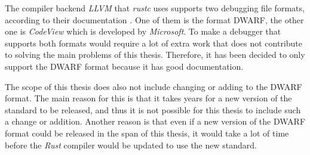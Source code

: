 %



The compiler backend \emph{LLVM} that \emph{rustc} uses supports two debugging file formats, according to their documentation \cite{llvm-dbs}.
One of them is the format \gls{DWARF}, the other one is \emph{CodeView} which is developed by \emph{Microsoft}.
To make a debugger that supports both formats would require a lot of extra work that does not contribute to solving the main problems of this thesis.
Therefore, it has been decided to only support the \gls{DWARF} format because it has good documentation.


The scope of this thesis does also not include changing or adding to the \gls{DWARF} format.
The main reason for this is that it takes years for a new version of the standard to be released, and thus it is not possible for this thesis to include such a change or addition.
Another reason is that even if a new version of the \gls{DWARF} format could be released in the span of this thesis, it would take a lot of time before the \emph{Rust} compiler would be updated to use the new standard.


